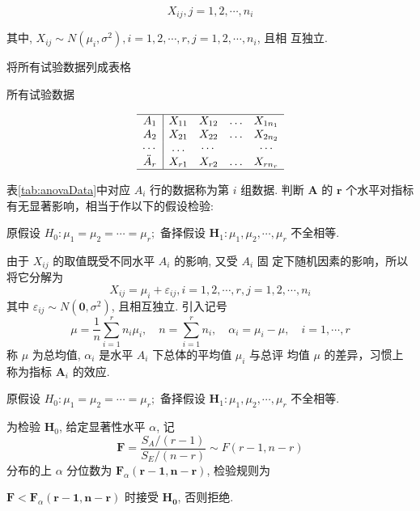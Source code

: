 $$
X_{i j}, j=1,2, \cdots, n_{i}
$$

其中, $X_{i j} \sim N\left(\mu_{i}, \sigma^{2}\right), i=1,2, \cdots, r, j=1,2, \cdots, n_{i}$, 且相
互独立. 

将所有试验数据列成表格

\begin{table}
\caption{所有试验数据}
      \label{tab:anovaData}
$$\begin{array}{c|cccc}
    \hline A_{1} & X_{11} & X_{12} & \ldots & X_{1 n_{1}} \\
    A_{2} & X_{21} & X_{22} & \ldots & X_{2 n_{2}} \\
    \cdots & \ldots & \cdots & & \cdots \\
    \ddot{A}_{r} & X_{r 1} & X_{r 2} & \ldots & X_{r n_{r}} \\
    \hline
    \end{array}
$$  
\end{table}


表\cref{tab:anovaData}中对应 $A_{i}$ 行的数据称为第 $i$ 组数据. 判断 $\boldsymbol{A}$ 的 $\boldsymbol{r}$ 个水平对指标有无显著影响，相当于作以下的假设检验:

原假设 $H_{0}: \mu_{1}=\mu_{2}=\cdots=\mu_{r} ;$
备择假设 $\boldsymbol{H}_{1}: \mu_{1}, \mu_{2}, \cdots, \mu_{r}$ 不全相等. 

由于 \( X_{i j} \) 的取值既受不同水平 \( A_{i} \) 的影响, 又受 \( A_{i} \) 固 定下随机因素的影响，所以将它分解为
$$
X_{i j}=\mu_{i}+\varepsilon_{i j}, i=1,2, \cdots, r, j=1,2, \cdots, n_{i}\label{eq:anovaDecomposition}
$$
其中 \( \varepsilon_{i j} \sim N\left(\mathbf{0}, \sigma^{2}\right) \), 且相互独立. 引入记号
$$
\mu=\frac{1}{n} \sum_{i=1}^{r} n_{i} \mu_{i}, \quad n=\sum_{i=1}^{r} n_{i}, \quad \alpha_{i}=\mu_{i}-\mu, \quad i=1, \cdots, r
$$
称 \( \mu \) 为总均值, \( \alpha_{i} \) 是水平 \( A_{i} \) 下总体的平均值 \( \mu_{i} \) 与总评
均值 \( \mu \) 的差异，习惯上称为指标 \( \boldsymbol{A}_{i} \) 的效应. 

\begin{definition}
原假设 $H_{0}: \mu_{1}=\mu_{2}=\cdots=\mu_{r} ;$
备择假设 $\boldsymbol{H}_{1}: \mu_{1}, \mu_{2}, \cdots, \mu_{r}$ 不全相等. 

为检验 \( \boldsymbol{H}_{0} \), 给定显著性水平 \( \alpha \), 记 \[ \boldsymbol{F}=\frac{S_{A} /(r-1)}{S_{E} /(n-r)} \sim F(r-1, n-r) \] 分布的上 \( \alpha \) 分位数为 \( \boldsymbol{F}_{\alpha}(\boldsymbol{r}-\mathbf{1}, \boldsymbol{n}-\boldsymbol{r}) \), 检验规则为

\( \boldsymbol{F}<\boldsymbol{F}_{\alpha}(\boldsymbol{r}-\mathbf{1}, \boldsymbol{n}-\boldsymbol{r}) \) 时接受 \( \boldsymbol{H}_{\mathbf{0}} \), 否则拒绝. 
\end{definition}

